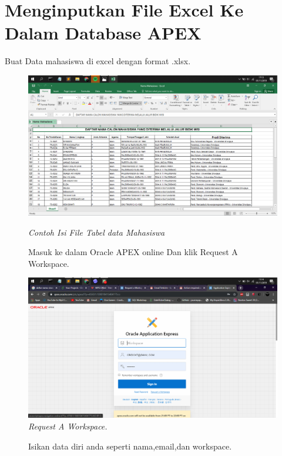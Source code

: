 \chapter{Menginputkan File Excel Ke Dalam Database APEX}

\begin{enumerate}
\item[1]Buat Data mahasiswa di excel dengan format .xlsx.
    \begin{figure}[!htbp]
    \begin{center}
    \includegraphics[scale=0.2]{figures/0.png}
    \caption{\textit{Contoh Isi File Tabel data Mahasiswa}}
    \end{center}   
\item[2]Masuk ke dalam Oracle APEX online Dan klik Request A Workspace.

    \begin{center}
    \includegraphics[scale=0.2]{figures/1.png}
    \caption{\textit{Request A Workspace.}}
    \end{center}
    \end{figure}
\begin{figure}[!htbp]
\item[3]Isikan data diri anda seperti nama,email,dan workspace.


\end{figure}
\end{enumerate}
